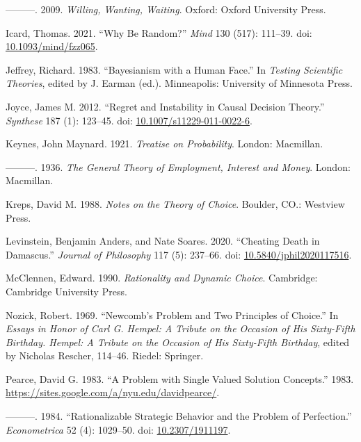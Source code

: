 \documentclass[
  10pt,
  letterpaper,
  DIV=11,
  numbers=noendperiod,
  twoside]{scrartcl}
\newlength{\cslhangindent}
\newenvironment{CSLReferences}[2] %
 {\begin{list}{}{%
  \setlength{\itemindent}{0pt}
  \setlength{\leftmargin}{0pt}
  \setlength{\parsep}{0pt}
  \ifodd #1
   \setlength{\leftmargin}{\cslhangindent}
   \setlength{\itemindent}{-1\cslhangindent}
  \fi
  \setlength{\itemsep}{#2\baselineskip}}}
 {\end{list}}
\begin{document}
\begin{CSLReferences}{1}{0}
---------. 2009. \emph{Willing, Wanting, Waiting}. Oxford: Oxford
University Press.

Icard, Thomas. 2021. {``Why Be Random?''} \emph{Mind} 130 (517):
111--39. doi:
\href{https://doi.org/10.1093/mind/fzz065}{10.1093/mind/fzz065}.

Jeffrey, Richard. 1983. {``Bayesianism with a Human Face.''} In
\emph{Testing Scientific Theories}, edited by J. Earman (ed.).
Minneapolis: University of Minnesota Press.

Joyce, James M. 2012. {``Regret and Instability in Causal Decision
Theory.''} \emph{Synthese} 187 (1): 123--45. doi:
\href{https://doi.org/10.1007/s11229-011-0022-6}{10.1007/s11229-011-0022-6}.

Keynes, John Maynard. 1921. \emph{Treatise on Probability}. London:
Macmillan.

---------. 1936. \emph{The General Theory of Employment, Interest and
Money}. London: Macmillan.

Kreps, David M. 1988. \emph{Notes on the Theory of Choice}. Boulder,
CO.: Westview Press.

Levinstein, Benjamin Anders, and Nate Soares. 2020. {``Cheating Death in
Damascus.''} \emph{Journal of Philosophy} 117 (5): 237--66. doi:
\href{https://doi.org/10.5840/jphil2020117516}{10.5840/jphil2020117516}.

McClennen, Edward. 1990. \emph{Rationality and Dynamic Choice}.
Cambridge: {C}ambridge {U}niversity {P}ress.

Nozick, Robert. 1969. {``Newcomb's Problem and Two Principles of
Choice.''} In \emph{Essays in Honor of Carl {G}. Hempel: A Tribute on
the Occasion of His Sixty-Fifth Birthday. Hempel: A Tribute on the
Occasion of His Sixty-Fifth Birthday}, edited by Nicholas Rescher,
114--46. Riedel: Springer.

Pearce, David G. 1983. {``A Problem with Single Valued Solution
Concepts.''} 1983.
\url{https://sites.google.com/a/nyu.edu/davidpearce/}.

---------. 1984. {``Rationalizable Strategic Behavior and the Problem of
Perfection.''} \emph{Econometrica} 52 (4): 1029--50. doi:
\href{https://doi.org/10.2307/1911197}{10.2307/1911197}.


\end{CSLReferences}
\end{document}
